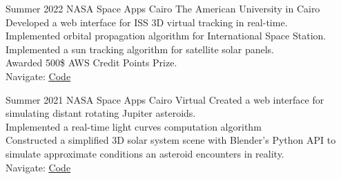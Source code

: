 \documentclass[hidelinks]{report}
\begin{document}
\entry 
    {Summer 2022}
    {NASA Space Apps Cairo}
    {The American University in Cairo }
    {}
    { \textbullet Developed a web interface for ISS 3D virtual tracking in real-time. \\
      \textbullet Implemented orbital propagation algorithm for International Space Station.\\ 
      \textbullet Implemented a sun tracking algorithm for satellite solar panels.\\
      \textbullet Awarded 500\$ AWS Credit Points Prize.\\ 
      \textbullet Navigate: \href{\github/Apollo}{\underline{Code}}
    }


\entry
    {Summer 2021}
    {NASA Space Apps Cairo}
    {Virtual} 
    {}
    {
      \textbullet Created a web interface for simulating distant rotating Jupiter asteroids.\\
      \textbullet Implemented a real-time light curves computation algorithm \\
      \textbullet Constructed a simplified 3D solar system scene with Blender's Python API to simulate approximate conditions an asteroid encounters in reality. \\
      \textbullet Navigate: \href{\github/Asteroid-Bent}{\underline{Code}}
    }
\end{document}
